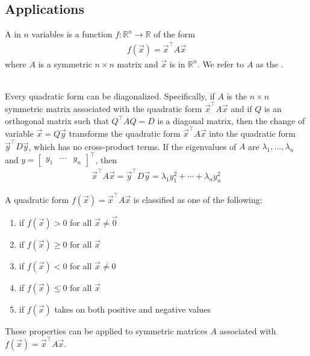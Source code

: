\documentclass{article}
\begin{document}
\subsection{Applications}
\begin{definition}
    A  in $n$ variables is a function $f:\mathbb{R}^n\to\mathbb{R}$ of the form
    \begin{align*}
        f(\vec x) = \vec x^\intercal A\vec x
    \end{align*}
    where $A$ is a symmetric $n\times n$ matrix and $\vec x$ is in $\mathbb{R}^n$. We refer to $A$ as the .
\end{definition}
\begin{theorem}
    \\
    Every quadratic form can be diagonalized. Specifically, if $A$ is the $n\times n$ symmetric matrix associated with the quadratic form $\vec x^\intercal A\vec x$ and if $Q$ is an orthogonal matrix such that $Q^\intercal AQ=D$ is a diagonal matrix, then the change of variable $\vec x = Q\vec y$ transforms the quadratic form $\vec x^\intercal A\vec x$ into the quadratic form $\vec y^\intercal D\vec y$, which has no cross-product terms.
    If the eigenvalues of $A$ are $\lambda_1, ...,\lambda_n$ and $y=\begin{bmatrix}
        y_1 &\cdots &y_n
    \end{bmatrix}^\intercal $, then
    \begin{align*}
        \vec x^\intercal A\vec x = \vec y^\intercal D\vec y = \lambda_1 y_1^2+\cdots+\lambda_n y_n^2
    \end{align*}
\end{theorem}
\begin{definition}
    A quadratic form $f(\vec x) = \vec x^\intercal A\vec x$ is classified as one of the following:
    \begin{enumerate}
        \item {} if $f(\vec x)>0$ for all $\vec x \not= \vec 0$
        \item {} if $f(\vec x)\geq 0$ for all $\vec x$
        \item {} if $f(\vec x)<0$ for all $\vec x \not= 0$
        \item {} if $f(\vec x)\leq 0$ for all $\vec x$
        \item {} if $f(\vec x)$ takes on both positive and negative values
    \end{enumerate}
    These properties can be applied to symmetric matrices $A$ associated with $f(\vec x)=\vec x^\intercal A\vec x$.
\end{definition}
\end{document}
